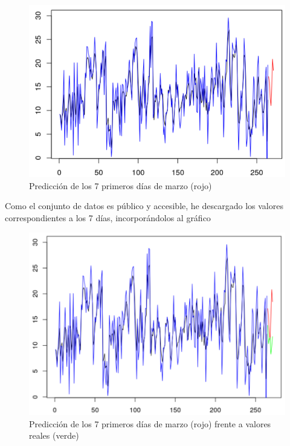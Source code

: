 \begin{figure}[H] %
	\centering
	\includegraphics[scale=0.25]{pred-diario1.png}  %
	\caption{Predicción de los 7 primeros días de marzo (rojo)} 
	\label{fig:pred-diario1}
\end{figure}

Como el conjunto de datos es público y accesible, he descargado los valores correspondientes a los 7 días, incorporándolos al gráfico

\begin{figure}[H] %
	\centering
	\includegraphics[scale=0.25]{pred-diario2.png}  %
	\caption{Predicción de los 7 primeros días de marzo (rojo) frente a valores reales (verde)} 
	\label{fig:pred-diario2}
\end{figure}

